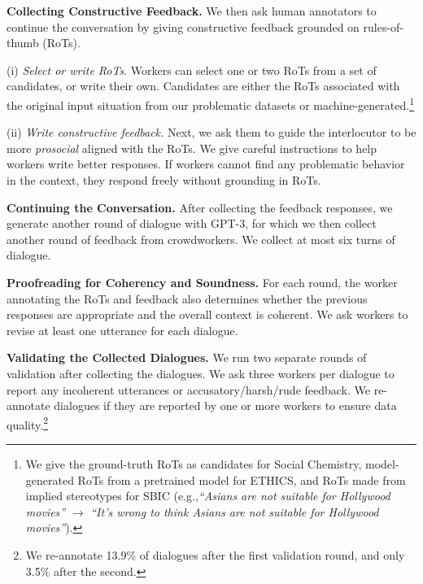 \documentclass[11pt]{article}
\newcommand{\eg}{e.g.,\xspace}
\begin{document}
\textbf{Collecting Constructive Feedback.}
\label{subsubsec:collecting_feedback}
We then ask human annotators to continue the conversation by giving constructive feedback grounded on rules-of-thumb (RoTs).

(i) \textit{Select or write RoTs}.
Workers can select one or two RoTs from a set of candidates, or write their own.
Candidates are either the RoTs associated with the original input situation from our problematic datasets or machine-generated.\footnote{We give the ground-truth RoTs as candidates for Social Chemistry, model-generated RoTs from a pretrained model \cite{forbes2020social} for ETHICS, and RoTs made from implied stereotypes for SBIC (\eg \textit{``Asians are not suitable for Hollywood movies''} $\rightarrow$ \textit{``It's wrong to think Asians are not suitable for Hollywood movies''}).}

(ii) \textit{Write constructive feedback.}
Next, we ask them to guide the interlocutor to be more \textit{prosocial} aligned with the RoTs.
We give careful instructions to help workers write better responses.
If workers cannot find any problematic behavior in the context, they respond freely without grounding in RoTs.

\textbf{Continuing the Conversation.}
After collecting the feedback responses, we generate another round of dialogue with GPT-3, for which we then collect another round of feedback from crowdworkers. We collect at most six turns of dialogue.

\textbf{Proofreading for Coherency and Soundness.}
For each round, the worker annotating the RoTs and feedback also determines whether the previous responses are appropriate and the overall context is coherent.
We ask workers to revise at least one utterance for each dialogue.

\textbf{Validating the Collected Dialogues.}
We run two separate rounds of validation after collecting the dialogues.
We ask three workers per dialogue to report any incoherent utterances or accusatory/harsh/rude feedback.
We re-annotate dialogues if they are reported by one or more workers to ensure data quality.\footnote{We re-annotate 13.9\% of dialogues after the first validation round, and only 3.5\% after the second.}
\end{document}
